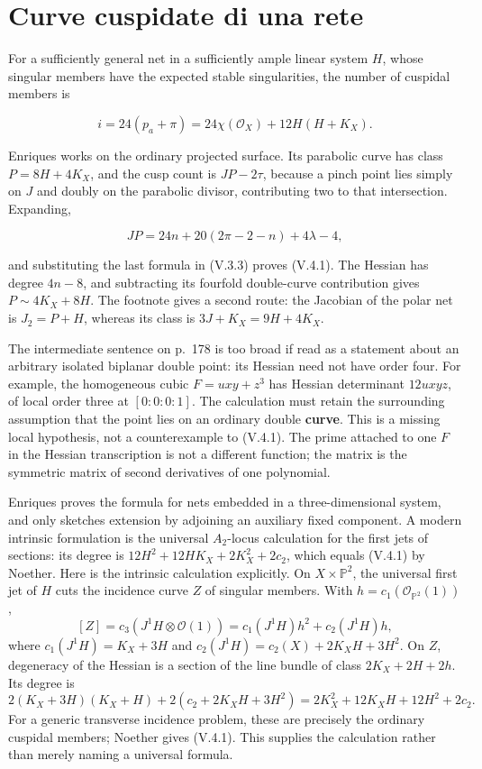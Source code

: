 \section{Curve cuspidate di una rete}
\label{cp1-v-4}

For a sufficiently general net in a sufficiently ample linear system \(H\), whose singular members have the expected stable singularities, the number of cuspidal members is

\[
i=24(p_a+\pi)=24\chi(\mathcal O_X)+12H(H+K_X). \tag{V.4.1}
\]

Enriques works on the ordinary projected surface. Its parabolic curve has class \(P=8H+4K_X\), and the cusp count is \(JP-2\tau\), because a pinch point lies simply on \(J\) and doubly on the parabolic divisor, contributing two to that intersection. Expanding,

\[
JP=24n+20(2\pi-2-n)+4\lambda-4,
\]

and substituting the last formula in (V.3.3) proves (V.4.1). The Hessian has degree \(4n-8\), and subtracting its fourfold double-curve contribution gives \(P\sim4K_X+8H\). The footnote gives a second route: the Jacobian of the polar net is \(J_2=P+H\), whereas its class is \(3J+K_X=9H+4K_X\).

The intermediate sentence on p.~178 is too broad if read as a statement about an arbitrary isolated biplanar double point: its Hessian need not have order four. For example, the homogeneous cubic \(F=uxy+z^3\) has Hessian determinant \(12uxyz\), of local order three at \([0:0:0:1]\). The calculation must retain the surrounding assumption that the point lies on an ordinary double \textbf{curve}. This is a missing local hypothesis, not a counterexample to (V.4.1). The prime attached to one \(F\) in the Hessian transcription is not a different function; the matrix is the symmetric matrix of second derivatives of one polynomial.

Enriques proves the formula for nets embedded in a three-dimensional system, and only sketches extension by adjoining an auxiliary fixed component. A modern intrinsic formulation is the universal \(A_2\)-locus calculation for the first jets of sections: its degree is \(12H^2+12HK_X+2K_X^2+2c_2\), which equals (V.4.1) by Noether. Here is the intrinsic calculation explicitly. On \(X\times\mathbb P^2\), the universal first jet of \(H\) cuts the incidence curve \(Z\) of singular members. With \(h=c_1(\mathcal O_{\mathbb P^2}(1))\), \[
[Z]=c_3(J^1H\otimes\mathcal O(1))
=c_1(J^1H)h^2+c_2(J^1H)h,
\] where \(c_1(J^1H)=K_X+3H\) and \(c_2(J^1H)=c_2(X)+2K_X H+3H^2\). On \(Z\), degeneracy of the Hessian is a section of the line bundle of class \(2K_X+2H+2h\). Its degree is \[
2(K_X+3H)(K_X+H)+2(c_2+2K_X H+3H^2)
=2K_X^2+12K_X H+12H^2+2c_2.
\] For a generic transverse incidence problem, these are precisely the ordinary cuspidal members; Noether gives (V.4.1). This supplies the calculation rather than merely naming a universal formula.

